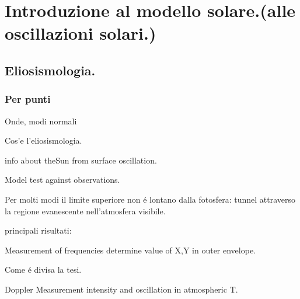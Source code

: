 \chapter{Introduzione al modello solare.(alle oscillazioni solari.)}
\PartialToc


\section{Eliosismologia.}

\subsection{Per punti}
\begin{itemize*}
\item Onde, modi normali
\item Cos'e l'eliosismologia.
\item info about theSun from surface oscillation.
\item Model test against observations.
\item Per molti modi il limite superiore non \'e lontano dalla fotosfera: tunnel attraverso la regione evanescente nell'atmosfera visibile.
\item principali risultati:
    \item Measurement of frequencies determine value of X,Y in outer envelope.
\item Come \'e divisa la tesi.



\item Doppler Measurement intensity and oscillation in atmospheric T.


\end{itemize*}
